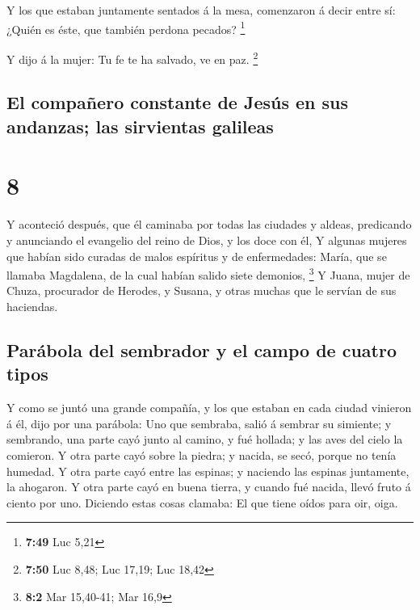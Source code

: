  Y los que estaban juntamente sentados á la mesa,
comenzaron á decir entre sí: ¿Quién es éste, que también perdona
pecados? \footnote{\textbf{7:49} Luc 5,21}

 Y dijo á la mujer: Tu fe te ha salvado, ve en paz.
\footnote{\textbf{7:50} Luc 8,48; Luc 17,19; Luc 18,42}

\hypertarget{el-compauxf1ero-constante-de-jesuxfas-en-sus-andanzas-las-sirvientas-galileas}{%
\subsection{El compañero constante de Jesús en sus andanzas; las
sirvientas
galileas}\label{el-compauxf1ero-constante-de-jesuxfas-en-sus-andanzas-las-sirvientas-galileas}}

\hypertarget{section-7}{%
\section{8}\label{section-7}}

 Y aconteció después, que él caminaba por todas las
ciudades y aldeas, predicando y anunciando el evangelio del reino de
Dios, y los doce con él,  Y algunas mujeres que habían
sido curadas de malos espíritus y de enfermedades: María, que se llamaba
Magdalena, de la cual habían salido siete demonios, \footnote{\textbf{8:2}
  Mar 15,40-41; Mar 16,9}  Y Juana, mujer de Chuza,
procurador de Herodes, y Susana, y otras muchas que le servían de sus
haciendas.

\hypertarget{paruxe1bola-del-sembrador-y-el-campo-de-cuatro-tipos}{%
\subsection{Parábola del sembrador y el campo de cuatro
tipos}\label{paruxe1bola-del-sembrador-y-el-campo-de-cuatro-tipos}}

 Y como se juntó una grande compañía, y los que estaban en
cada ciudad vinieron á él, dijo por una parábola:  Uno que
sembraba, salió á sembrar su simiente; y sembrando, una parte cayó junto
al camino, y fué hollada; y las aves del cielo la comieron.
 Y otra parte cayó sobre la piedra; y nacida, se secó,
porque no tenía humedad.  Y otra parte cayó entre las
espinas; y naciendo las espinas juntamente, la ahogaron. 
Y otra parte cayó en buena tierra, y cuando fué nacida, llevó fruto á
ciento por uno. Diciendo estas cosas clamaba: El que tiene oídos para
oir, oiga.


